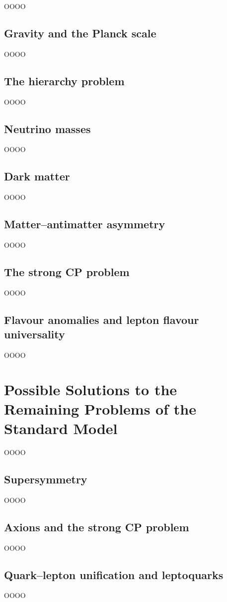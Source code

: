 OOOO

\subsection{Gravity and the Planck scale}
\label{heading:Chapters-CH2-9}

OOOO

\subsection{The hierarchy problem}
\label{heading:Chapters-CH2-10}

OOOO

\subsection{Neutrino masses}
\label{heading:Chapters-CH2-11}

OOOO

\subsection{Dark matter}
\label{heading:Chapters-CH2-12}

OOOO

\subsection{Matter--antimatter asymmetry}
\label{heading:Chapters-CH2-13}

OOOO

\subsection{The strong CP problem}
\label{heading:Chapters-CH2-14}

OOOO

\subsection{Flavour anomalies and lepton flavour universality}
\label{heading:Chapters-CH2-15}

OOOO

\section{Possible Solutions to the Remaining Problems of the Standard Model}
\label{heading:Chapters-CH2-16}

OOOO

\subsection{Supersymmetry}
\label{heading:Chapters-CH2-17}

OOOO

\subsection{Axions and the strong CP problem}
\label{heading:Chapters-CH2-18}

OOOO

\subsection{Quark--lepton unification and leptoquarks}
\label{heading:Chapters-CH2-19}

OOOO

